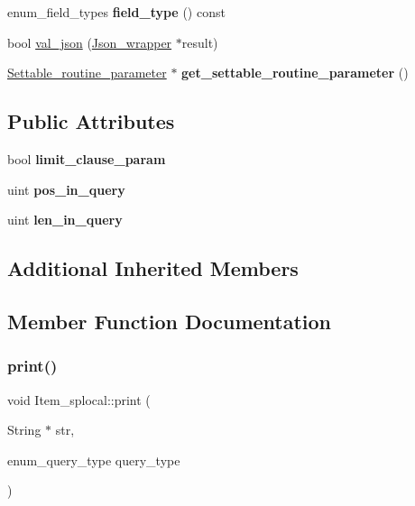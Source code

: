 \begin{DoxyCompactItemize}
\item 
\mbox{\label{classItem__splocal_ad24a5cf42e508f54445552ca4c7ad537}} 
enum\+\_\+field\+\_\+types {\bfseries field\+\_\+type} () const
\item 
bool \mbox{\hyperlink{classItem__splocal_a4417b9609600a6583814a12ef594a3b5}{val\+\_\+json}} (\mbox{\hyperlink{classJson__wrapper}{Json\+\_\+wrapper}} $\ast$result)
\item 
\mbox{\label{classItem__splocal_a08c4a80a4cba75a86af1578340468396}} 
\mbox{\hyperlink{classSettable__routine__parameter}{Settable\+\_\+routine\+\_\+parameter}} $\ast$ {\bfseries get\+\_\+settable\+\_\+routine\+\_\+parameter} ()
\end{DoxyCompactItemize}
\subsection*{Public Attributes}
\begin{DoxyCompactItemize}
\item 
\mbox{\label{classItem__splocal_a0af5cafaed84604f0b204e1932efdc6e}} 
bool {\bfseries limit\+\_\+clause\+\_\+param}
\item 
\mbox{\label{classItem__splocal_abebbcaf604e5f6f774ee7e8695b6780b}} 
uint {\bfseries pos\+\_\+in\+\_\+query}
\item 
\mbox{\label{classItem__splocal_a22c05601d94fe4cdccf4d1d609364f76}} 
uint {\bfseries len\+\_\+in\+\_\+query}
\end{DoxyCompactItemize}
\subsection*{Additional Inherited Members}


\subsection{Member Function Documentation}
\mbox{\label{classItem__splocal_a29ba8bcb74a30bdaf98fe72fdc28b543}} 
\subsubsection{\texorpdfstring{print()}{print()}}
{\footnotesize\ttfamily void Item\+\_\+splocal\+::print (\begin{DoxyParamCaption}\item[{String $\ast$}]{str,  }\item[{enum\+\_\+query\+\_\+type}]{query\+\_\+type }\end{DoxyParamCaption})\hspace{0.3cm}{\ttfamily [virtual]}}

